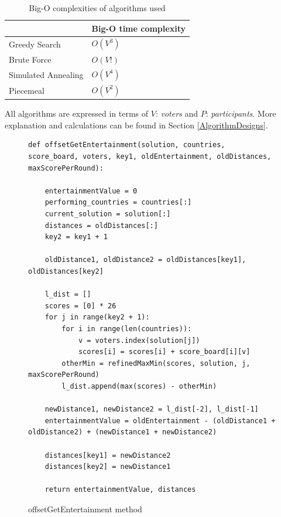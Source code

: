 \documentclass[12pt]{report}
\begin{document}
\begin{table}[H]
\centering
\caption{Big-O complexities of algorithms used}
\label{bigO}
\begin{tabular}{|l|l|}
\hline
        & Big-O time complexity \\ \hline
Greedy Search & $O(V^3)$ \\ \hline
Brute Force & $O(V!)$ \\ \hline
Simulated Annealing & $O(V^4)$ \\ \hline
Piecemeal & $O(V^2)$ \\ \hline
\end{tabular}
\end{table}
All algorithms are expressed in terms of $V$: \textit{voters} and $P$: \textit{participants}. More explanation and calculations can be found in Section \ref{AlgorithmDesigns}.

\begin{figure}[H]
\caption{offsetGetEntertainment method}
\label{offsetGetEntertainment}
\begin{lstlisting}
def offsetGetEntertainment(solution, countries, score_board, voters, key1, oldEntertainment, oldDistances, maxScorePerRound):
    
    entertainmentValue = 0
    performing_countries = countries[:]
    current_solution = solution[:]
    distances = oldDistances[:]
    key2 = key1 + 1

    oldDistance1, oldDistance2 = oldDistances[key1], oldDistances[key2]

    l_dist = []
    scores = [0] * 26
    for j in range(key2 + 1):
        for i in range(len(countries)):
            v = voters.index(solution[j])
            scores[i] = scores[i] + score_board[i][v]
        otherMin = refinedMaxMin(scores, solution, j, maxScorePerRound)
        l_dist.append(max(scores) - otherMin)
    
    newDistance1, newDistance2 = l_dist[-2], l_dist[-1]
    entertainmentValue = oldEntertainment - (oldDistance1 + oldDistance2) + (newDistance1 + newDistance2)
    
    distances[key1] = newDistance2
    distances[key2] = newDistance1
    
    return entertainmentValue, distances
\end{lstlisting}
\end{figure}
\end{document}
